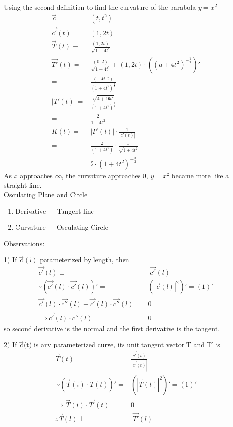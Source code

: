 \documentclass{article}
\begin{document}
        Using the second definition to find the curvature of the parabola $y = x^2$
        \begin{align}
            \vec{c} =& (t,t^2)\\
            \vec{c'}(t) =& (1,2t)\\
            \vec{T}(t) =& \frac{(1,2t)}{\sqrt{1+4t^2}}\\
            \vec{T'}(t) =& \frac{(0,2)}{\sqrt{1+4t^2}} + (1,2t)\cdot((a+4t^2)^{-\frac{1}{2}})'\\
            =& \frac{(-4t,2)}{(1+4t^2)^\frac{3}{2}}\\
            |T'(t)| =& \frac{\sqrt{4+16t^2}}{(1+4t^2)^{\frac{3}{2}}}\\
            =& \frac{2}{1+4t^2}\\
            K(t) =& |T'(t)|\cdot\frac{1}{|c'(t)|}\\
            =& \frac{2}{(1+4t^2)} \cdot\frac{1}{\sqrt{1+4t^2}}\\
            =& 2\cdot(1+4t^2)^{-\frac{3}{2}}
        \end{align}
        As $x$ approaches $\infty$, the curvature approaches 0, $y=x^2$ became more like a straight line.\\
        
        Osculating Plane and Circle
        \begin{enumerate}
            \item Derivative --- Tangent line
            \item Curvature  --- Osculating Circle
        \end{enumerate}
        
        Observations:
        
        1) If $\vec{c}(l)$ parameterized by length, then
        \begin{align}
            \vec{c'}(l) \perp&\; \vec{c''}(l)\\
            \because (\vec{c'}(l)\cdot\vec{c'}(l))' =& (|\vec{c}(l)|^2)' = (1)'\\
             \vec{c'}(l)\cdot\vec{c''}(l) + \vec{c'}(l)\cdot\vec{c''}(l)=& 0\\
             \Rightarrow \vec{c'}(l)\cdot\vec{c''}(l) =& 0
        \end{align}
        so second derivative is the normal and the first derivative is the tangent.
        
        2) If $\vec{c}$(t) is any parameterized curve, its unit tangent vector T and T' is
        \begin{align}
            \vec{T}(t) =& \frac{\vec{c'}(t)}{|\vec{c'}(t)|}\\\
            \because (\vec{T}(t)\cdot\vec{T}(t))' =& (|\vec{T}(t)|^2)' = (1)'\\
            \Rightarrow \vec{T}(t)\cdot\vec{T'}(t) =& 0\\
            \therefore \vec{T}(l) \perp&\; \vec{T'}(l)
        \end{align}
        
\end{document}
